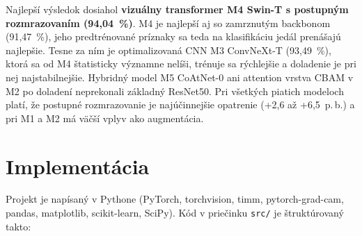 Najlepší výsledok dosiahol \textbf{vizuálny transformer M4 Swin-T
s postupným rozmrazovaním (94,04~\%)}. M4 je najlepší aj so zamrznutým
backbonom (91,47~\%), jeho predtrénované príznaky sa teda na
klasifikáciu jedál prenášajú najlepšie. Tesne za ním je optimalizovaná CNN
M3 ConvNeXt-T (93,49~\%), ktorá sa od M4 štatisticky významne nelíši,
trénuje sa rýchlejšie a doladenie je pri nej najstabilnejšie. Hybridný
model M5 CoAtNet-0 ani attention vrstva CBAM v M2 po doladení neprekonali
základný ResNet50. Pri všetkých piatich modeloch platí, že postupné
rozmrazovanie je najúčinnejšie opatrenie (+2,6 až +6,5~p.\,b.) a pri M1
a M2 má väčší vplyv ako augmentácia.

\section{Implementácia}
\label{sec:implementacia}

Projekt je napísaný v Pythone (PyTorch, torchvision, timm, pytorch-grad-cam,
pandas, matplotlib, scikit-learn, SciPy). Kód v priečinku \texttt{src/} je
štruktúrovaný takto:

